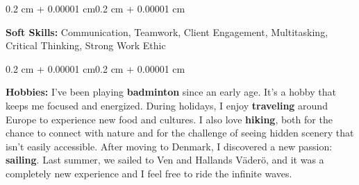 \documentclass[10pt, letterpaper]{article}
\newenvironment{onecolentry}{
    \begin{adjustwidth}{0.2 cm + 0.00001 cm}{0.2 cm + 0.00001 cm}
}{
    \end{adjustwidth}
}
\begin{document}
        \vspace{0.2 cm}

        \begin{onecolentry}
            \textbf{Soft Skills:} Communication, Teamwork, Client Engagement, Multitasking, Critical Thinking, Strong Work Ethic
        \end{onecolentry}

        \vspace{0.2 cm}

        \begin{onecolentry}
            \textbf{Hobbies:}
            I've been playing \textbf{badminton} since an early age. It's a hobby that keeps me focused and energized. During holidays, I enjoy \textbf{traveling} around Europe to experience new food and cultures. I also love \textbf{hiking}, both for the chance to connect with nature and for the challenge of seeing hidden scenery that isn't easily accessible. After moving to Denmark, I discovered a new passion: \textbf{sailing}. Last summer, we sailed to Ven and Hallands Väderö, and it was a completely new experience and I feel free to ride the infinite waves.
        \end{onecolentry}
\end{document}
